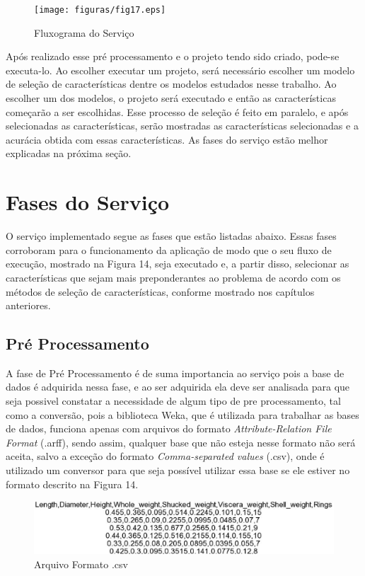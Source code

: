 \begin{figure}[H]
	\centering
		\texttt{[image: figuras/fig17.eps]}
	\caption{Fluxograma do Serviço}
	\label{fig:fig14}
\end{figure}

Após realizado esse pré processamento e o projeto tendo sido criado, pode-se executa-lo. Ao escolher executar um projeto, será necessário escolher um modelo de seleção de características dentre os modelos estudados nesse trabalho. Ao escolher um dos modelos, o projeto será executado e então as características começarão a ser escolhidas. Esse processo de seleção é feito em paralelo, e após selecionadas as características, serão mostradas as características selecionadas e a acurácia obtida com essas características. As fases do serviço estão melhor explicadas na próxima seção.

\section{Fases do Serviço}
\label{sec:fases}
O serviço implementado segue as fases que estão listadas abaixo. Essas fases corroboram para o funcionamento da aplicação de modo que o seu fluxo de execução, mostrado na Figura 14, seja executado e, a partir disso, selecionar as características que sejam mais preponderantes ao problema de acordo com os métodos de seleção de características, conforme mostrado nos capítulos anteriores.
\subsection{Pré Processamento}
\label{sec:preprocessamento}
A fase de Pré Processamento é de suma importancia ao serviço pois a base de dados é adquirida nessa fase, e ao ser adquirida ela deve ser analisada para que seja possivel constatar a necessidade de algum tipo de pre processamento, tal como a conversão, pois a biblioteca Weka, que é utilizada para trabalhar as bases de dados, funciona apenas com arquivos do formato \textit{Attribute-Relation File Format} (.arff), sendo assim, qualquer base que não esteja nesse formato não será aceita, salvo a exceção do formato \textit{Comma-separated values} (.csv), onde é utilizado um conversor para que seja possível utilizar essa base se ele estiver no formato descrito na Figura 14.

\begin{figure}[H]
	\centering
	\label{fig15}
		\includegraphics[keepaspectratio=true,scale=0.5]{figuras/fig15.eps}
	\caption{Arquivo Formato .csv}
\end{figure}

